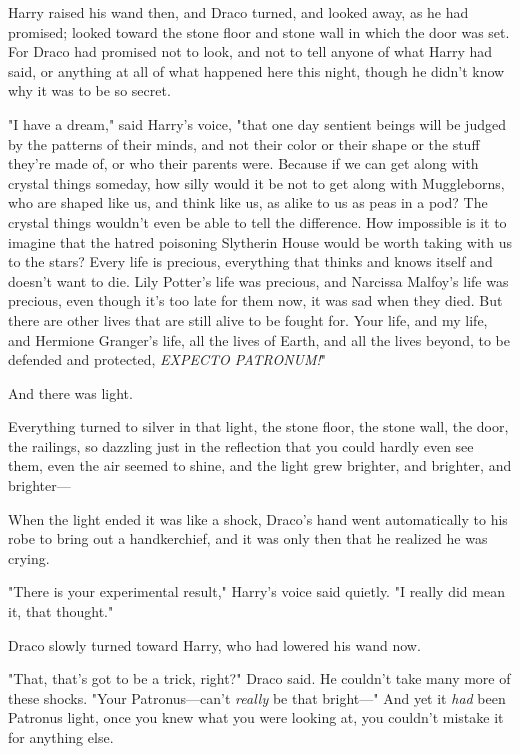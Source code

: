 Harry raised his wand then, and Draco turned, and looked away, as he had 
promised; looked toward the stone floor and stone wall in which the door was 
set. For Draco had promised not to look, and not to tell anyone of what Harry 
had said, or anything at all of what happened here this night, though he didn't 
know why it was to be so secret.

"I have a dream," said Harry's voice, "that one day sentient beings will be 
judged by the patterns of their minds, and not their color or their shape or 
the stuff they're made of, or who their parents were. Because if we can get 
along with crystal things someday, how silly would it be not to get along with 
Muggleborns, who are shaped like us, and think like us, as alike to us as peas 
in a pod? The crystal things wouldn't even be able to tell the difference. How 
impossible is it to imagine that the hatred poisoning Slytherin House would be 
worth taking with us to the stars? Every life is precious, everything that 
thinks and knows itself and doesn't want to die. Lily Potter's life was 
precious, and Narcissa Malfoy's life was precious, even though it's too late 
for them now, it was sad when they died. But there are other lives that are 
still alive to be fought for. Your life, and my life, and Hermione Granger's 
life, all the lives of Earth, and all the lives beyond, to be defended and 
protected, \emph{EXPECTO PATRONUM!}"

And there was light.

Everything turned to silver in that light, the stone floor, the stone wall, the 
door, the railings, so dazzling just in the reflection that you could hardly 
even see them, even the air seemed to shine, and the light grew brighter, and 
brighter, and brighter---

When the light ended it was like a shock, Draco's hand went automatically to 
his robe to bring out a handkerchief, and it was only then that he realized he 
was crying.

"There is your experimental result," Harry's voice said quietly. "I really did 
mean it, that thought."

Draco slowly turned toward Harry, who had lowered his wand now.

"That, that's got to be a trick, right?" Draco said. He couldn't take many more 
of these shocks. "Your Patronus---can't \emph{really} be that bright---" And 
yet it \emph{had} been Patronus light, once you knew what you were looking at, 
you couldn't mistake it for anything else.

